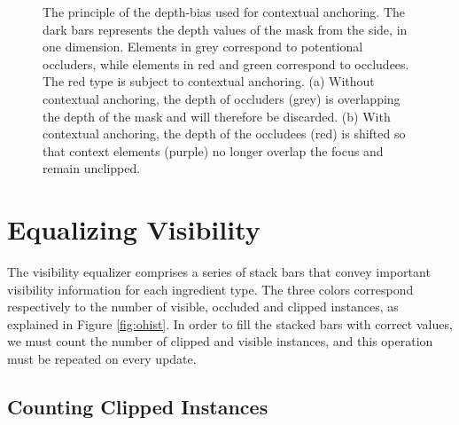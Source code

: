 \begin{figure}[t]
\centering
{}
\caption{\label{fig:islands} 
The principle of the depth-bias used for contextual anchoring.
The dark bars represents the depth values of the mask from the side, in one dimension. 
Elements in grey correspond to potentional occluders, while elements in red and green correspond to occludees.
The red type is subject to contextual anchoring.
(a) Without contextual anchoring, the depth of occluders (grey) is overlapping the depth of the mask and will therefore be discarded. 
(b) With contextual anchoring, the depth of the occludees (red) is shifted so that context elements (purple) no longer overlap the focus and remain unclipped.}
\vspace{-3mm}
\end{figure}

\section{Equalizing Visibility}




The visibility equalizer comprises a series of stack bars that convey important visibility information for each ingredient type.
The three colors correspond respectively to the number of visible, occluded and clipped instances, as explained in Figure \ref{fig:ohist}.
In order to fill the stacked bars with correct values, we must count the number of clipped and visible instances, and this operation must be repeated on every update.

\vspace{-2mm}
\subsection{Counting Clipped Instances}


